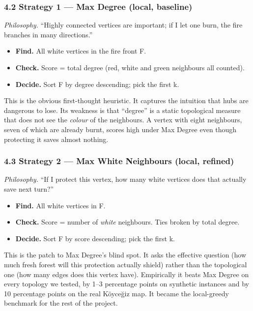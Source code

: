 \documentclass[
  11pt,
]{article}
\providecommand{\tightlist}{%
  \setlength{\itemsep}{0pt}\setlength{\parskip}{0pt}}
\begin{document}
\subsubsection{4.2 Strategy 1 --- Max Degree (local,
baseline)}\label{strategy-1-max-degree-local-baseline}

\emph{Philosophy.} ``Highly connected vertices are important; if I let
one burn, the fire branches in many directions.''

\begin{itemize}
\tightlist
\item
  \textbf{Find.} All white vertices in the fire front F.
\item
  \textbf{Check.} Score = total degree (red, white and green neighbours
  all counted).
\item
  \textbf{Decide.} Sort F by degree descending; pick the first k.
\end{itemize}

This is the obvious first-thought heuristic. It captures the intuition
that hubs are dangerous to lose. Its weakness is that ``degree'' is a
static topological measure that does not see the \emph{colour} of the
neighbours. A vertex with eight neighbours, seven of which are already
burnt, scores high under Max Degree even though protecting it saves
almost nothing.

\subsubsection{4.3 Strategy 2 --- Max White Neighbours (local,
refined)}\label{strategy-2-max-white-neighbours-local-refined}

\emph{Philosophy.} ``If I protect this vertex, how many white vertices
does that actually save next turn?''

\begin{itemize}
\tightlist
\item
  \textbf{Find.} All white vertices in F.
\item
  \textbf{Check.} Score = number of \emph{white} neighbours. Ties broken
  by total degree.
\item
  \textbf{Decide.} Sort F by score descending; pick the first k.
\end{itemize}

This is the patch to Max Degree's blind spot. It asks the effective
question (how much fresh forest will this protection actually shield)
rather than the topological one (how many edges does this vertex have).
Empirically it beats Max Degree on every topology we tested, by 1--3
percentage points on synthetic instances and by 10 percentage points on
the real Köyceğiz map. It became the local-greedy benchmark for the rest
of the project.
\end{document}
